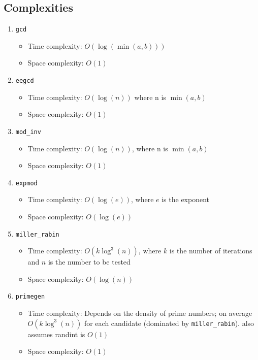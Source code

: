 \documentclass[a4paper]{article}
\begin{document}
\subsection{Complexities}
\begin{enumerate}
    \item \texttt{gcd}
        \begin{itemize}
            \item Time complexity: \( O(\log(\min(a, b))) \)
            \item Space complexity: \( O(1) \)
        \end{itemize}

    \item \texttt{eegcd}
        \begin{itemize}
            \item Time complexity: \( O(\log(n)) \) where n is $\min(a, b)$
            \item Space complexity: \( O(1) \)
        \end{itemize}

    \item \texttt{mod\_inv}
        \begin{itemize}
            \item Time complexity: \( O(\log(n)) \), where n is $\min(a, b)$
            \item Space complexity: \( O(1) \)
        \end{itemize}

    \item \texttt{expmod}
        \begin{itemize}
            \item Time complexity: \( O(\log(e)) \), where \( e \) is the exponent
            \item Space complexity: \( O(\log(e)) \)
        \end{itemize}

    \item \texttt{miller\_rabin}
        \begin{itemize}
            \item Time complexity: \( O(k \log^3(n)) \), where \( k \) is the number of iterations and \( n \) is the number to be tested
            \item Space complexity: \( O(\log(n)) \)
        \end{itemize}

    \item \texttt{primegen}
        \begin{itemize}
            \item Time complexity: Depends on the density of prime numbers; on average \( O(k \log^3(n)) \) for each candidate (dominated by \texttt{miller\_rabin}). also assumes randint is \( O(1) \)
            \item Space complexity: \( O(1) \)
        \end{itemize}


\end{enumerate}
\end{document}
